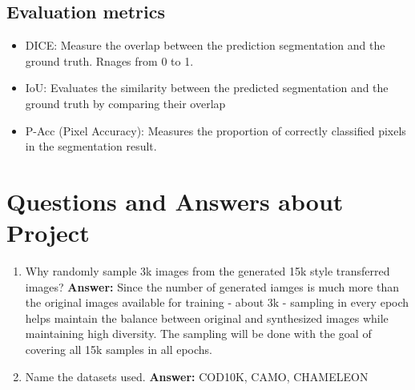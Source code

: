 \documentclass{article}
\begin{document}
\subsection{Evaluation metrics}
\begin{itemize}
	\item DICE: Measure the overlap between the prediction segmentation and the ground truth. Rnages from 0 to 1.
	\item IoU: Evaluates the similarity between the predicted segmentation and the ground truth by comparing their overlap
	\item P-Acc (Pixel Accuracy): Measures the proportion of correctly classified pixels in the segmentation result.
\end{itemize}
\section{Questions and Answers about Project}
\begin{enumerate}
	\item Why randomly sample 3k images from the generated 15k style transferred images?
	\textbf{Answer: } Since the number of generated iamges is much more than the original images available for training - about
	3k - sampling in every epoch helps maintain the balance between original and synthesized images while maintaining high
	diversity. The sampling will be done with the goal of covering all 15k samples in all epochs.
	\item Name the datasets used.
	\textbf{Answer: } COD10K, CAMO, CHAMELEON
\end{enumerate}
\end{document}
